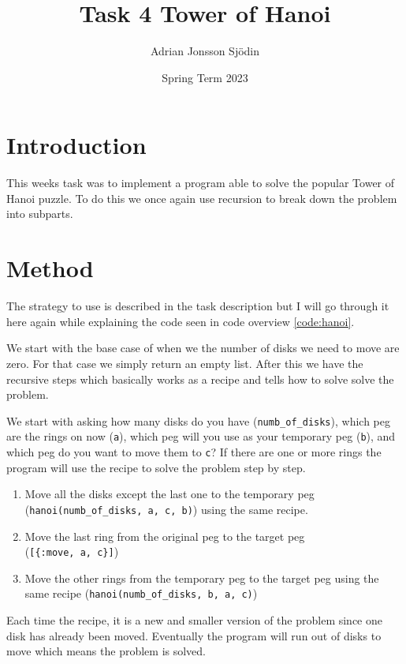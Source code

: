 \documentclass[a4paper,11pt]{article}
\begin{document}
\title{
    \textbf{Task 4 Tower of Hanoi}
}
\author{Adrian Jonsson Sjödin}
\date{Spring Term 2023}

\maketitle

\section*{Introduction}
This weeks task was to implement a program able to solve the popular Tower of Hanoi puzzle. To do this we once again use 
recursion to break down the problem into subparts.

\section*{Method}
The strategy to use is described in the task description but I will go through it here again while explaining the code 
seen in code overview \ref{code:hanoi}. 

We start with the base case of when we the number of disks we need to move are zero. For that case we simply return an 
empty list. After this we have the recursive steps which basically works as a recipe and tells how to solve solve the problem.

We start with asking how many disks do you have ({\tt numb\_of\_disks}), which peg are the rings on now ({\tt a}), which peg 
will you use as your temporary peg ({\tt b}), and which peg do you want to move them to {\tt c}? If there are one or more rings
the program will use the recipe to solve the problem step by step. 
\begin{enumerate}
    \item Move all the disks except the last one to the temporary peg \\({\tt hanoi(numb\_of\_disks, a, c, b)}) using the same 
    recipe.
    \item Move the last ring from the original peg to the target peg \\({\tt [\{:move, a, c\}]})
    \item Move the other rings from the temporary peg to the target peg using the same recipe 
    ({\tt hanoi(numb\_of\_disks, b, a, c)})
\end{enumerate}
Each time the recipe, it is a new and smaller version of the problem since one disk has already been moved. Eventually the 
program will run out of disks to move which means the problem is solved. 
\end{document}

